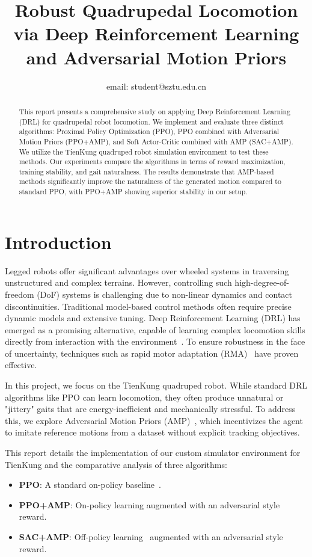\documentclass[conference]{IEEEtran}
\title{Robust Quadrupedal Locomotion via Deep Reinforcement Learning and Adversarial Motion Priors}
\author{\IEEEauthorblockN{Student Name}
\IEEEauthorblockA{School of Artificial Intelligence, Shenzhen Technology University, Shenzhen, China}
email: student@sztu.edu.cn
}
\begin{document}
\maketitle

\begin{abstract}
This report presents a comprehensive study on applying Deep Reinforcement Learning (DRL) for quadrupedal robot locomotion. We implement and evaluate three distinct algorithms: Proximal Policy Optimization (PPO), PPO combined with Adversarial Motion Priors (PPO+AMP), and Soft Actor-Critic combined with AMP (SAC+AMP). We utilize the TienKung quadruped robot simulation environment to test these methods. Our experiments compare the algorithms in terms of reward maximization, training stability, and gait naturalness. The results demonstrate that AMP-based methods significantly improve the naturalness of the generated motion compared to standard PPO, with PPO+AMP showing superior stability in our setup.
\end{abstract}

\section{Introduction}

Legged robots offer significant advantages over wheeled systems in traversing unstructured and complex terrains. However, controlling such high-degree-of-freedom (DoF) systems is challenging due to non-linear dynamics and contact discontinuities. Traditional model-based control methods often require precise dynamic models and extensive tuning. Deep Reinforcement Learning (DRL) has emerged as a promising alternative, capable of learning complex locomotion skills directly from interaction with the environment~\cite{sutton2017reinforcement, hwangbo2019learning}. To ensure robustness in the face of uncertainty, techniques such as rapid motor adaptation (RMA)~\cite{kumar2021rma} have proven effective.

In this project, we focus on the TienKung quadruped robot. While standard DRL algorithms like PPO can learn locomotion, they often produce unnatural or "jittery" gaits that are energy-inefficient and mechanically stressful. To address this, we explore Adversarial Motion Priors (AMP)~\cite{peng2021amp}, which incentivizes the agent to imitate reference motions from a dataset without explicit tracking objectives.

This report details the implementation of our custom simulator environment for TienKung and the comparative analysis of three algorithms:
\begin{itemize}
    \item \textbf{PPO}: A standard on-policy baseline~\cite{schulman2017proximal}.
    \item \textbf{PPO+AMP}: On-policy learning augmented with an adversarial style reward.
    \item \textbf{SAC+AMP}: Off-policy learning~\cite{haarnoja2018soft} augmented with an adversarial style reward.
\end{itemize}
\end{document}
